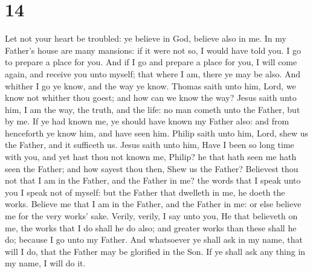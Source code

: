 \hypertarget{section-13}{%
\section{14}\label{section-13}}

 Let not your heart be troubled: ye believe in God, believe
also in me.  In my Father's house are many mansions: if it
were not so, I would have told you. I go to prepare a place for you.
 And if I go and prepare a place for you, I will come again,
and receive you unto myself; that where I am, there ye may be also.
 And whither I go ye know, and the way ye know. 
Thomas saith unto him, Lord, we know not whither thou goest; and how can
we know the way?  Jesus saith unto him, I am the way, the
truth, and the life: no man cometh unto the Father, but by me.
 If ye had known me, ye should have known my Father also:
and from henceforth ye know him, and have seen him.  Philip
saith unto him, Lord, shew us the Father, and it sufficeth us.
 Jesus saith unto him, Have I been so long time with you,
and yet hast thou not known me, Philip? he that hath seen me hath seen
the Father; and how sayest thou then, Shew us the Father? 
Believest thou not that I am in the Father, and the Father in me? the
words that I speak unto you I speak not of myself: but the Father that
dwelleth in me, he doeth the works.  Believe me that I am
in the Father, and the Father in me: or else believe me for the very
works' sake.  Verily, verily, I say unto you, He that
believeth on me, the works that I do shall he do also; and greater works
than these shall he do; because I go unto my Father.  And
whatsoever ye shall ask in my name, that will I do, that the Father may
be glorified in the Son.  If ye shall ask any thing in my
name, I will do it.

